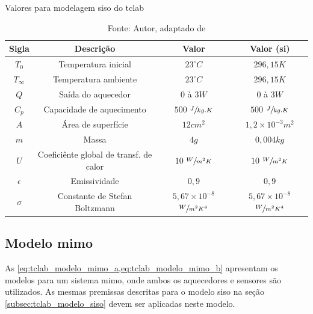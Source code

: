 \begin{table}[h]
	\centering
	\caption{Valores para modelagem \acrshort{siso} do \acrshort{tclab}}
	\label{tab:tclab_modelo_siso_valores}
	\begin{tabular}{cccc} \toprule
		{Sigla} 		& {Descrição} 								& {Valor} 											& {Valor (\acrshort{si})} 							\\ \midrule
		$T_{0}$ 		& Temperatura inicial 						& $23^\circ C$ 										& $296{,}15 K $										\\
		$T_{\infty}$	& Temperatura ambiente						& $23^\circ C$										& $296{,}15 K $										\\
		$Q$				& Saída do aquecedor						& $0$ à $3 W$										& $0$ à $3 W$										\\
		$C_p$			& Capacidade de aquecimento					& $500$ $\sfrac{J}{kg.K}$							& $500$ $\sfrac{J}{kg.K}$							\\
		$A$				& Área de superfície						& $12 cm^{2}$										& $1{,}2{\times}10^{-3} m^{2}$						\\
		$m$				& Massa										& $4 g$												& $0{,}004 kg	$									\\
		$U$				& Coeficiênte global de transf. de calor	& $10$ $\sfrac{W}{m^{2}K}$							& $10$ $\sfrac{W}{m^{2}K}$							\\
		$\epsilon$		& Emissividade								& $0{,}9$											& $0{,}9$											\\
		$\sigma$		& Constante de Stefan Boltzmann				& $5{,}67{\times}10^{-8}$ $\sfrac{W}{m^{2}K^{4}}$	& $5{,}67{\times}10^{-8}$ $\sfrac{W}{m^{2}K^{4}}$	\\ \bottomrule
	\end{tabular}
	\caption*{Fonte: Autor, adaptado de }
\end{table}

\subsection{Modelo \acrshort{mimo}}
\label{subsec:tclab_modelo_mimo}

As \cref{eq:tclab_modelo_mimo_a,eq:tclab_modelo_mimo_b} apresentam os modelos
para um sistema \acrshort{mimo}, onde ambos os aquecedores e sensores são utilizados.
As mesmas premissas descritas para o modelo \acrshort{siso} na seção \ref{subsec:tclab_modelo_siso}
devem ser aplicadas neste modelo.

